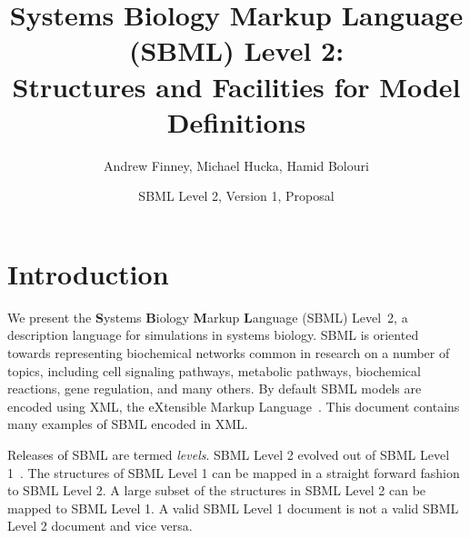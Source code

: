 \documentclass[10pt]{cekarticle}
\begin{document}

\title{Systems Biology Markup Language (SBML) Level 2:\\
  Structures and Facilities for Model Definitions}

\author{Andrew Finney, Michael Hucka, Hamid Bolouri}


\address{Systems Biology Workbench Development Group\\
  ERATO Kitano Systems Biology Project\\
  Control and Dynamical Systems, MC 107-81\\
  California Institute of Technology, Pasadena, CA 91125, USA\\[3pt]
  \url{http://www.cds.caltech.edu/erato}}


\date{SBML Level 2, Version 1, Proposal}

\maketitlepage


\section{Introduction}
\label{sec:introduction}

We present the \textbf{S}ystems \textbf{B}iology \textbf{M}arkup
\textbf{L}anguage (SBML) Level~2, a description language for
simulations in systems biology.  SBML is oriented towards
representing biochemical networks common in research on a number
of topics, including cell signaling pathways, metabolic pathways,
biochemical reactions, gene regulation, and many others.  By default SBML models are encoded using XML, the
eXtensible Markup Language~\citep{bosak:1999,bray:1998}.  This document contains many examples of SBML encoded in XML.

Releases of SBML are termed \emph{levels}.  SBML Level 2 evolved out of
SBML Level 1~\citep{hucka:2001}.  The structures of SBML Level 1
can be mapped in a straight forward fashion to SBML Level 2.  A large
subset of the structures in SBML Level 2 can be mapped to SBML Level 1.
A valid SBML Level 1 document is not a valid SBML Level 2 document and vice versa.
\end{document}
